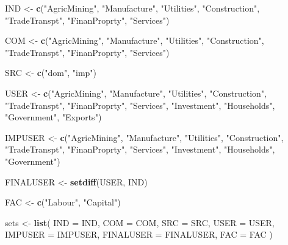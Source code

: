 \documentclass[12pt,twoside]{article}
\newenvironment{Shaded}{\begin{snugshade}}{\end{snugshade}}
\newcommand{\DataTypeTok}[1]{\textcolor[rgb]{0.13,0.29,0.53}{#1}}
\newcommand{\KeywordTok}[1]{\textcolor[rgb]{0.13,0.29,0.53}{\textbf{#1}}}
\newcommand{\NormalTok}[1]{#1}
\newcommand{\StringTok}[1]{\textcolor[rgb]{0.31,0.60,0.02}{#1}}
\let\oldShaded\Shaded
\let\endoldShaded\endShaded
\renewenvironment{Shaded}{\footnotesize\oldShaded}{\endoldShaded}
\begin{document}
\begin{Shaded}
\begin{Highlighting}[]
\NormalTok{IND <-}\StringTok{ }\KeywordTok{c}\NormalTok{(}\StringTok{"AgricMining"}\NormalTok{, }\StringTok{"Manufacture"}\NormalTok{, }\StringTok{"Utilities"}\NormalTok{, }\StringTok{"Construction"}\NormalTok{, }
         \StringTok{"TradeTranspt"}\NormalTok{, }\StringTok{"FinanProprty"}\NormalTok{, }\StringTok{"Services"}\NormalTok{)}

\NormalTok{COM <-}\StringTok{ }\KeywordTok{c}\NormalTok{(}\StringTok{"AgricMining"}\NormalTok{, }\StringTok{"Manufacture"}\NormalTok{, }\StringTok{"Utilities"}\NormalTok{, }\StringTok{"Construction"}\NormalTok{, }
         \StringTok{"TradeTranspt"}\NormalTok{, }\StringTok{"FinanProprty"}\NormalTok{, }\StringTok{"Services"}\NormalTok{)}

\NormalTok{SRC <-}\StringTok{ }\KeywordTok{c}\NormalTok{(}\StringTok{"dom"}\NormalTok{, }\StringTok{"imp"}\NormalTok{)}

\NormalTok{USER <-}\StringTok{ }\KeywordTok{c}\NormalTok{(}\StringTok{"AgricMining"}\NormalTok{, }\StringTok{"Manufacture"}\NormalTok{, }\StringTok{"Utilities"}\NormalTok{, }\StringTok{"Construction"}\NormalTok{, }
          \StringTok{"TradeTranspt"}\NormalTok{, }\StringTok{"FinanProprty"}\NormalTok{, }\StringTok{"Services"}\NormalTok{, }\StringTok{"Investment"}\NormalTok{, }
          \StringTok{"Households"}\NormalTok{, }\StringTok{"Government"}\NormalTok{, }\StringTok{"Exports"}\NormalTok{)}

\NormalTok{IMPUSER <-}\StringTok{ }\KeywordTok{c}\NormalTok{(}\StringTok{"AgricMining"}\NormalTok{, }\StringTok{"Manufacture"}\NormalTok{, }\StringTok{"Utilities"}\NormalTok{, }\StringTok{"Construction"}\NormalTok{, }
             \StringTok{"TradeTranspt"}\NormalTok{, }\StringTok{"FinanProprty"}\NormalTok{, }\StringTok{"Services"}\NormalTok{, }\StringTok{"Investment"}\NormalTok{, }
             \StringTok{"Households"}\NormalTok{, }\StringTok{"Government"}\NormalTok{)}

\NormalTok{FINALUSER <-}\StringTok{ }\KeywordTok{setdiff}\NormalTok{(USER, IND)}

\NormalTok{FAC <-}\StringTok{ }\KeywordTok{c}\NormalTok{(}\StringTok{"Labour"}\NormalTok{, }\StringTok{"Capital"}\NormalTok{)}

\NormalTok{sets <-}\StringTok{ }\KeywordTok{list}\NormalTok{(}
  \DataTypeTok{IND =}\NormalTok{ IND,}
  \DataTypeTok{COM =}\NormalTok{ COM,}
  \DataTypeTok{SRC =}\NormalTok{ SRC,}
  \DataTypeTok{USER =}\NormalTok{ USER,}
  \DataTypeTok{IMPUSER =}\NormalTok{ IMPUSER,}
  \DataTypeTok{FINALUSER =}\NormalTok{ FINALUSER,}
  \DataTypeTok{FAC =}\NormalTok{ FAC}
\NormalTok{)}
\end{Highlighting}
\end{Shaded}
\end{document}
